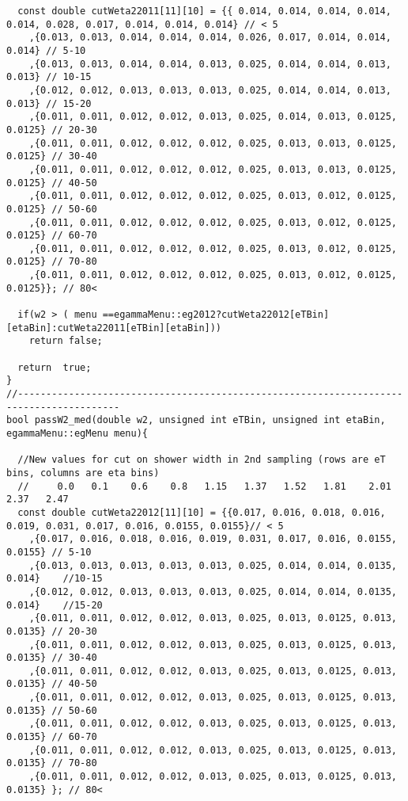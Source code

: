 \begin{lstlisting}
  const double cutWeta22011[11][10] = {{ 0.014, 0.014, 0.014, 0.014, 0.014, 0.028, 0.017, 0.014, 0.014, 0.014} // < 5 
	,{0.013, 0.013, 0.014, 0.014, 0.014, 0.026, 0.017, 0.014, 0.014, 0.014} // 5-10
	,{0.013, 0.013, 0.014, 0.014, 0.013, 0.025, 0.014, 0.014, 0.013, 0.013} // 10-15 
	,{0.012, 0.012, 0.013, 0.013, 0.013, 0.025, 0.014, 0.014, 0.013, 0.013} // 15-20 
	,{0.011, 0.011, 0.012, 0.012, 0.013, 0.025, 0.014, 0.013, 0.0125, 0.0125} // 20-30
	,{0.011, 0.011, 0.012, 0.012, 0.012, 0.025, 0.013, 0.013, 0.0125, 0.0125} // 30-40
	,{0.011, 0.011, 0.012, 0.012, 0.012, 0.025, 0.013, 0.013, 0.0125, 0.0125} // 40-50
	,{0.011, 0.011, 0.012, 0.012, 0.012, 0.025, 0.013, 0.012, 0.0125, 0.0125} // 50-60
	,{0.011, 0.011, 0.012, 0.012, 0.012, 0.025, 0.013, 0.012, 0.0125, 0.0125} // 60-70
	,{0.011, 0.011, 0.012, 0.012, 0.012, 0.025, 0.013, 0.012, 0.0125, 0.0125} // 70-80
	,{0.011, 0.011, 0.012, 0.012, 0.012, 0.025, 0.013, 0.012, 0.0125, 0.0125}}; // 80<  

  if(w2 > ( menu ==egammaMenu::eg2012?cutWeta22012[eTBin][etaBin]:cutWeta22011[eTBin][etaBin]))
    return false;
    
  return  true;
}
//----------------------------------------------------------------------------------------
bool passW2_med(double w2, unsigned int eTBin, unsigned int etaBin, egammaMenu::egMenu menu){
  
  //New values for cut on shower width in 2nd sampling (rows are eT bins, columns are eta bins)
  //     0.0   0.1    0.6    0.8   1.15   1.37   1.52   1.81    2.01   2.37   2.47
  const double cutWeta22012[11][10] = {{0.017, 0.016, 0.018, 0.016, 0.019, 0.031, 0.017, 0.016, 0.0155, 0.0155}// < 5 
	,{0.017, 0.016, 0.018, 0.016, 0.019, 0.031, 0.017, 0.016, 0.0155, 0.0155} // 5-10
	,{0.013, 0.013, 0.013, 0.013, 0.013, 0.025, 0.014, 0.014, 0.0135, 0.014}    //10-15
	,{0.012, 0.012, 0.013, 0.013, 0.013, 0.025, 0.014, 0.014, 0.0135, 0.014}    //15-20
	,{0.011, 0.011, 0.012, 0.012, 0.013, 0.025, 0.013, 0.0125, 0.013, 0.0135} // 20-30
	,{0.011, 0.011, 0.012, 0.012, 0.013, 0.025, 0.013, 0.0125, 0.013, 0.0135} // 30-40
	,{0.011, 0.011, 0.012, 0.012, 0.013, 0.025, 0.013, 0.0125, 0.013, 0.0135} // 40-50
	,{0.011, 0.011, 0.012, 0.012, 0.013, 0.025, 0.013, 0.0125, 0.013, 0.0135} // 50-60
	,{0.011, 0.011, 0.012, 0.012, 0.013, 0.025, 0.013, 0.0125, 0.013, 0.0135} // 60-70
	,{0.011, 0.011, 0.012, 0.012, 0.013, 0.025, 0.013, 0.0125, 0.013, 0.0135} // 70-80
	,{0.011, 0.011, 0.012, 0.012, 0.013, 0.025, 0.013, 0.0125, 0.013, 0.0135} }; // 80<  


\end{lstlisting}
